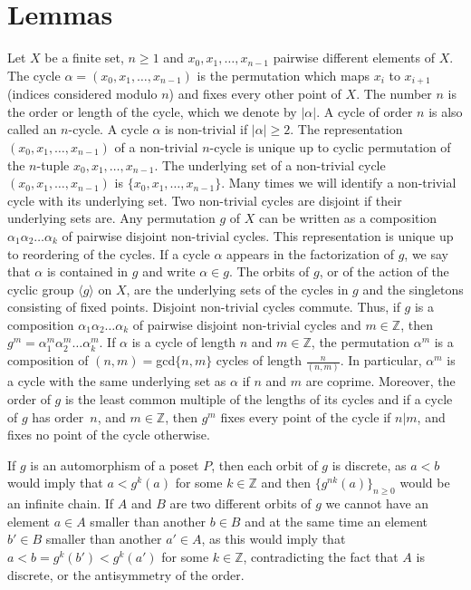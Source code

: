 \documentclass[ALCO,published]{cedram}
\newcommand{\Z}{\mathbb{Z}}
\begin{document}
\section{Lemmas} \label{sectionlemmas}


Let $X$ be a finite set, $n\ge 1$ and $x_0,x_1,\ldots, x_{n-1}$ pairwise different elements of $X$. The cycle $\alpha =(x_0,x_1,\ldots , x_{n-1})$ is the permutation which maps $x_i$ to $x_{i+1}$ (indices considered modulo $n$) and fixes every other point of $X$. The number $n$ is the order or length of the cycle, which we denote by $|\alpha|$. A cycle of order $n$ is also called an $n$-cycle. A cycle $\alpha$ is non-trivial if $|\alpha|\ge 2$. The representation $(x_0,x_1,\ldots, x_{n-1})$ of a non-trivial $n$-cycle is unique up to cyclic permutation of the $n$-tuple $x_0,x_1,\ldots,x_{n-1}$. The underlying set of a non-trivial cycle $(x_0,x_1,\ldots , x_{n-1})$ is $\{x_0,x_1,\ldots , x_{n-1}\}$. Many times we will identify a non-trivial cycle with its underlying set. Two non-trivial cycles are disjoint if their underlying sets are. Any permutation $g$ of $X$ can be written as a composition $\alpha_1 \alpha_2 \ldots \alpha_k$ of pairwise disjoint non-trivial cycles. This representation is unique up to reordering of the cycles.
If a cycle $\alpha$ appears in the factorization of $g$, we say that $\alpha$ is contained in $g$ and write $\alpha \in g$. The orbits of $g$, or of the action of the cyclic group $\langle g \rangle$ on $X$, are the underlying sets of the cycles in $g$ and the singletons consisting of fixed points. Disjoint non-trivial cycles commute. Thus, if $g$ is a composition $\alpha_1 \alpha_2 \ldots \alpha_k$ of pairwise disjoint non-trivial cycles and $m\in \Z$, then $g^m=\alpha_1^m \alpha_2^m \ldots \alpha_k^m$. If $\alpha$ is a cycle of length $n$ and $m\in \Z$, the permutation $\alpha^m$ is a composition of $(n,m)=$gcd$\{n,m\}$ cycles of length $\frac{n}{(n,m)}$. In particular, $\alpha^m$ is a cycle with the same underlying set as $\alpha$ if $n$ and $m$ are coprime. Moreover, the order of $g$ is the least common multiple of the lengths of its cycles and if a cycle of $g$ has order~$n$, and $m\in \Z$, then $g^m$ fixes every point of the cycle if $n|m$, and fixes no point of the cycle otherwise. 


If $g$ is an automorphism of a poset $P$, then each orbit of $g$ is discrete, as $a<b$ would imply that $a<g^k(a)$ for some $k\in \Z$ and then $\{g^{nk}(a)\}_{n\ge 0}$ would be an infinite chain. If $A$ and $B$ are two different orbits of $g$ we cannot have an element $a\in A$ smaller than another $b\in B$ and at the same time an element $b'\in B$ smaller than another $a'\in A$, as this would imply that $a<b=g^k(b')<g^k(a')$ for some $k\in \Z$, contradicting the fact that $A$ is discrete, or the antisymmetry of the order.
\end{document}
